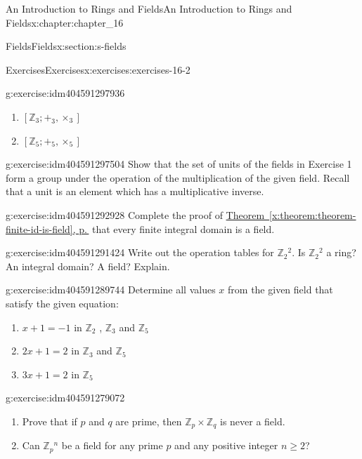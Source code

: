 \documentclass[twoside,10pt,]{book}
\newcommand{\xreffont}{\relax}
\numberwithin{equation}{section}
\begin{document}
\begin{chapterptx}{An Introduction to Rings and Fields}{}{An Introduction to Rings and Fields}{}{}{x:chapter:chapter_16}
\begin{sectionptx}{Fields}{}{Fields}{}{}{x:section:s-fields}
\begin{exercises-subsection}{Exercises}{}{Exercises}{}{}{x:exercises:exercises-16-2}
\begin{divisionexercise}{1}{}{}{g:exercise:idm404591297936}
\begin{enumerate}[label=(\alph*)]
\item{}\(\left[\mathbb{Z}_3; +_3, \times _3\right]\)%
\item{}\(\left[\mathbb{Z}_5; +_5, \times _5\right]\)%
\end{enumerate}
%
\end{divisionexercise}%
\begin{divisionexercise}{2}{}{}{g:exercise:idm404591297504}%
Show that the set of units of the fields in Exercise 1 form a group under the operation of the multiplication of the given field. Recall that a unit is an element which has a multiplicative inverse.%
\end{divisionexercise}%
\begin{divisionexercise}{3}{}{}{g:exercise:idm404591292928}%
Complete the proof of \hyperref[x:theorem:theorem-finite-id-is-field]{Theorem~{\xreffont\ref{x:theorem:theorem-finite-id-is-field}}, p.\,\pageref{x:theorem:theorem-finite-id-is-field}} that every finite integral domain is a field.%
\end{divisionexercise}%
\begin{divisionexercise}{4}{}{}{g:exercise:idm404591291424}%
Write out the operation tables for \(\mathbb{Z}_2{}^2\).   Is \(\mathbb{Z}_2{}^2\) a ring? An integral domain? A field? Explain.%
\end{divisionexercise}%
\begin{divisionexercise}{5}{}{}{g:exercise:idm404591289744}%
Determine all values \(x\) from the given field that satisfy the given equation:%
\begin{enumerate}[label=(\alph*)]
\item{}\(x + 1 = -1\)  in \(\mathbb{Z}_2\) , \(\mathbb{Z}_3\) and \(\mathbb{Z}_5\)%
\item{}\(2x + 1 = 2\) in \(\mathbb{Z}_3\) and  \(\mathbb{Z}_5\)%
\item{}\(3x + 1 = 2\)  in \(\mathbb{Z}_5\)%
\end{enumerate}
%
\end{divisionexercise}%
\begin{divisionexercise}{6}{}{}{g:exercise:idm404591279072}%
%
\begin{enumerate}[label=(\alph*)]
\item{}Prove that if \(p\) and \(q\) are prime, then \(\mathbb{Z}_p \times  \mathbb{Z}_q\) is never a field.%
\item{}Can \(\mathbb{Z}_p{}^n\) be a field for any prime \(p\) and any positive integer \(n \geq  2\)?%
\end{enumerate}
%
\end{divisionexercise}%

\end{exercises-subsection}
\end{sectionptx}
\end{chapterptx}
\end{document}
